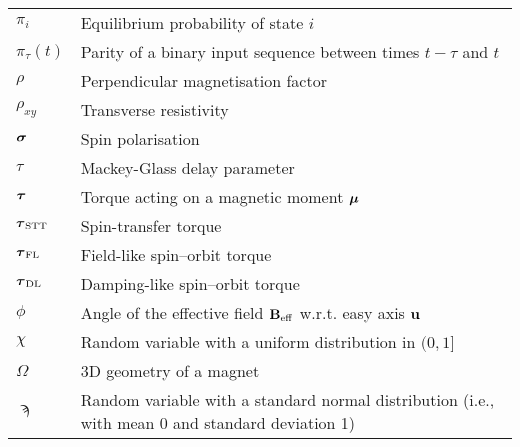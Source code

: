\begin{longtable}[l]{p{60pt} p{350pt}}
	$\pi_i$ & Equilibrium probability of state $i$ \\
	$\pi_\tau(t)$ & Parity of a binary input sequence between times $t-\tau$ and $t$\vspace{\whiteline}\\

	$\rho$ & Perpendicular magnetisation factor \\
	$\rho_{xy}$ & Transverse resistivity\vspace{\whiteline}\\
	
	$\boldsymbol{\mathbf{\sigma}}$ & Spin polarisation\vspace{\whiteline}\\

	$\tau$ & Mackey-Glass delay parameter \\
	$\boldsymbol{\mathbf{\tau}}$ & Torque acting on a magnetic moment $\boldsymbol{\mathbf{\mu}}$ \\
	$\boldsymbol{\mathbf{\tau}}_\mathrm{STT}$ & Spin-transfer torque \\
	$\boldsymbol{\mathbf{\tau}}_\mathrm{FL}$ & Field-like spin--orbit torque \\
	$\boldsymbol{\mathbf{\tau}}_\mathrm{DL}$ & Damping-like spin--orbit torque\vspace{\whiteline}\\

	$\phi$ & Angle of the effective field $\boldsymbol{\mathbf{B}}_\mathrm{eff}$ w.r.t. easy axis $\boldsymbol{\mathbf{u}}$\vspace{\whiteline}\\

	$\chi$ & Random variable with a uniform distribution in $(0, 1]$\vspace{\whiteline}\\
	
	$\Omega$ & 3D geometry of a magnet\vspace{\whiteline}\\
	
	$\sampi$ & Random variable with a standard normal distribution (i.e., with mean 0 and standard deviation 1) \\
\end{longtable}
